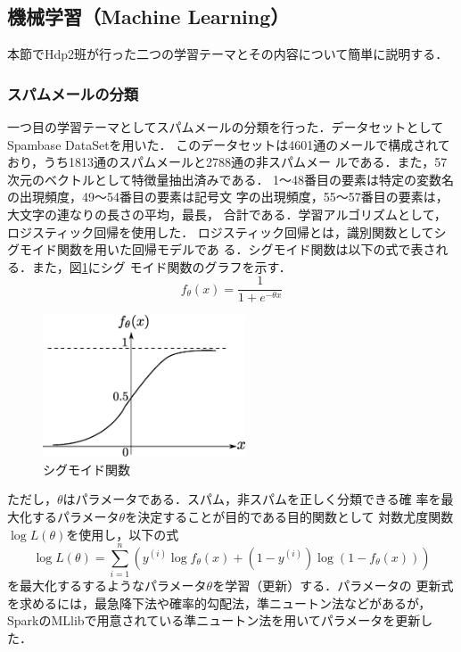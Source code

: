 \documentclass[a4paper,12pt]{jarticle}
\begin{document}
\subsection{機械学習（Machine Learning）}
本節でHdp2班が行った二つの学習テーマとその内容について簡単に説明する．
\subsubsection{スパムメールの分類}
一つ目の学習テーマとしてスパムメールの分類を行った．データセットとして
Spambase DataSet\cite{Spam}を用いた．
このデータセットは4601通のメールで構成されており，うち1813通のスパムメールと2788通の非スパムメー
ルである．また，57次元のベクトルとして特徴量抽出済みである．
1〜48番目の要素は特定の変数名の出現頻度，49〜54番目の要素は記号文
字の出現頻度，55〜57番目の要素は，大文字の連なりの長さの平均，最長，
合計である．学習アルゴリズムとして，ロジスティック回帰を使用した．
ロジスティック回帰とは，識別関数としてシグモイド関数を用いた回帰モデルであ
る．シグモイド関数は以下の式で表される．また，図\ref{fig:sigmoid}にシグ
モイド関数のグラフを示す．
%
\begin{equation}
 f_\theta (x) = \frac{1}{1+e^{-\theta x}}
\end{equation}
%
\begin{figure}[bp]
 \begin{center}
  \includegraphics[width=60mm]{fig/sigmoid.eps}
  \caption{シグモイド関数}
  \label{fig:sigmoid}
 \end{center}
\end{figure}
%
ただし，$\theta$はパラメータである．スパム，非スパムを正しく分類できる確
率を最大化するパラメータ$\theta$を決定することが目的である目的関数として
対数尤度関数$\log L(\theta)$を使用し，以下の式
%
\begin{equation}
 \log L(\theta) = \sum^n_{i=1}(y^{(i)}\log f_\theta(x)+(1-y^{(i)})\log
  (1-f_\theta (x)))
\end{equation}
%
を最大化するするようなパラメータ$\theta$を学習（更新）する．パラメータの
更新式を求めるには，最急降下法や確率的勾配法，準ニュートン法などがあるが，
SparkのMLlibで用意されている準ニュートン法を用いてパラメータを更新した．
\end{document}
